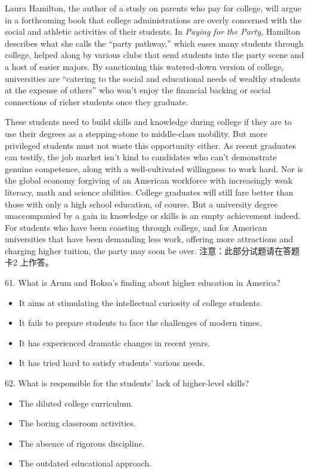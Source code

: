 \documentclass[UTF8,11pt]{ctexart}
\begin{document}
Laura Hamilton, the author of a study on parents who pay for college, will argue in a forthcoming book that college administrations are overly concerned with the social and athletic activities of their students. In\textit{ Paying for the Party,} Hamilton describes what she calls the “party pathway,” which eases many students through college, helped along by various clubs that send students into the party scene and a host of easier majors. By sanctioning this watered-down version of college, universities are “catering to the social and educational needs of wealthy students at the expense of others” who won’t enjoy the financial backing or social connections of richer students once they graduate.


These students need to build skills and knowledge during college if they are to use their degrees as a stepping-stone to middle-class mobility. But more privileged students must not waste this opportunity either. As recent graduates can testify, the job market isn’t kind to candidates who can’t demonstrate genuine competence, along with a well-cultivated willingness to work hard. Nor is the global economy forgiving of an American workforce with increasingly weak literacy, math and science abilities. College graduates will still fare better than those with only a high school education, of course. But a university degree unaccompanied by a gain in knowledge or skills is an empty achievement indeed. For students who have been coasting through college, and for American universities that have been demanding less work, offering more attractions and charging higher tuition, the party may soon be over. 注意：此部分试题请在答题卡2 上作答。


61. What is Arum and Roksa’s finding about higher education in America?


\begin{itemize}[leftmargin=2em,itemsep=.2em,topsep=.4em]\item[A.] It aims at stimulating the intellectual curiosity of college students.
\item[B.] It fails to prepare students to face the challenges of modern times.
\item[C.] It has experienced dramatic changes in recent years.
\item[D.] It has tried hard to satisfy students’ various needs.
\end{itemize}

62. What is responsible for the students’ lack of higher-level skills?


\begin{itemize}[leftmargin=2em,itemsep=.2em,topsep=.4em]\item[A.] The diluted college curriculum.
\item[B.] The boring classroom activities.
\item[C.] The absence of rigorous discipline.
\item[D.] The outdated educational approach.
\end{itemize}
\end{document}
